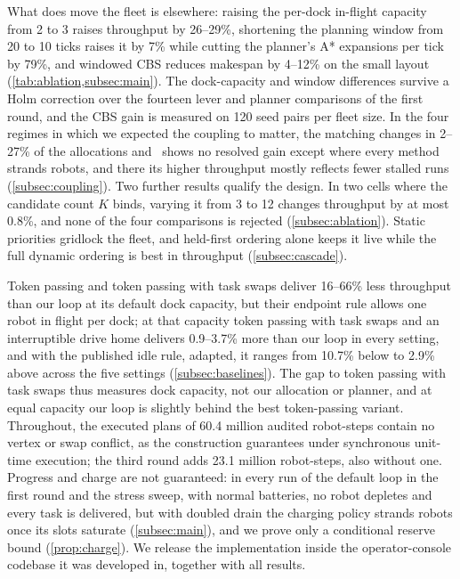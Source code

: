 What does move the fleet is elsewhere: raising the
per-dock in-flight capacity from 2 to 3 raises throughput by 26--29\%,
shortening the planning window from 20 to 10 ticks raises it by 7\% while
cutting the planner's A* expansions per tick by 79\%, and windowed CBS reduces makespan by
4--12\% on the small layout (\cref{tab:ablation,subsec:main}). The
dock-capacity and window differences survive a Holm correction over the
fourteen lever and planner comparisons of the first round, and the CBS gain
is measured on 120 seed pairs per fleet size. In the four regimes in which
we expected the coupling to matter, the matching changes in 2--27\% of the
allocations and \sname\ shows no resolved gain except where every method
strands robots, and there its higher throughput mostly reflects fewer stalled runs
(\cref{subsec:coupling}). Two further results qualify the design. In two cells where the
candidate count $K$ binds, varying it from 3 to 12 changes throughput by at most 0.8\%,
and none of the four comparisons is rejected (\cref{subsec:ablation}). Static priorities
gridlock the fleet, and held-first ordering alone keeps it live while the full dynamic
ordering is best in throughput (\cref{subsec:cascade}).

Token passing and token passing with task swaps \citep{ma2017lifelong}
deliver 16--66\% less throughput than our loop at its default dock
capacity, but their endpoint rule allows one robot in flight
per dock; at that capacity token passing with task swaps and an interruptible
drive home delivers 0.9--3.7\% more than our loop in every setting, and with
the published idle rule, adapted, it ranges from 10.7\% below to 2.9\% above
across the five settings (\cref{subsec:baselines}). The gap to token passing with task swaps thus
measures dock capacity, not our allocation or planner, and at equal capacity
our loop is slightly behind the best token-passing variant.
Throughout, the executed plans of 60.4 million audited robot-steps contain no
vertex or swap conflict, as the construction guarantees under synchronous
unit-time execution; the third round adds 23.1 million robot-steps, also
without one. Progress and charge
are not guaranteed: in every run of the default loop in the first round and the
stress sweep, with normal batteries, no robot depletes and every task is
delivered, but with doubled drain the charging policy
strands robots once its slots saturate (\cref{subsec:main}), and we prove
only a conditional reserve bound (\cref{prop:charge}). We release the
implementation inside the operator-console codebase it was developed in,
together with
all results.
